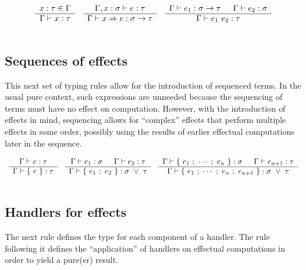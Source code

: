 \documentclass{article}
\begin{document}
\[ \begin{array}{ccc}
  \begin{array}{c}  x:\tau \in \Gamma  \\ \hline  \Gamma \vdash x:\tau  \end{array}

   &

  \begin{array}{c}  \Gamma, x:\sigma \vdash e:\tau  \\ \hline \Gamma \vdash x \Rightarrow e : \sigma \rightarrow \tau  \end{array}

   &

  \begin{array}{c}  \Gamma \vdash e_1 : \sigma \rightarrow \tau \hspace{1.5em}
   \Gamma \vdash e_2 : \sigma  \\ \hline  \Gamma \vdash e_1 ~ e_2 : \tau  \end{array}

  \\\\
 \end{array} \]

\noindent
\subsection{Sequences of effects}
This next set of typing rules allow for the introduction of sequenced terms.
In the usual pure context, such expressions are unneeded because the sequencing of terms
must have no effect on computation.
However, with the introduction of effects in mind, sequencing allows for ``complex'' effects
that perform multiple effects in some order, possibly using the results of earlier
effectual computations later in the sequence.

\[ \begin{array}{ccc}

  \begin{array}{c} 
   \Gamma \vdash e:\tau
   \\ \hline 
   \Gamma \vdash \{ ~ e ~ \} : \tau
   \end{array}

   &

  \begin{array}{c} 
   \Gamma \vdash e_1:\sigma \hspace{1.5em}
   \Gamma \vdash e_2:\tau
   \\ \hline 
   \Gamma \vdash \{ ~ e_1 ~ ; ~ e_2 ~ \} : \sigma ~ \lor ~ \tau
   \end{array}

   &

  \begin{array}{c} 
   \Gamma \vdash \{ ~ e_1 ~ ; ~ \cdots ~ ; ~ e_n ~ \} : \sigma \hspace{1.5em}
   \Gamma \vdash e_{n+1} : \tau
   \\ \hline 
   \Gamma \vdash \{ ~ e_1 ~ ; ~ \cdots ~ ; ~ e_n ~ ; ~ e_{n+1} ~ \}
   : \sigma ~ \lor ~ \tau
   \end{array}

  \\\\
 \end{array} \]

\noindent
\subsection{Handlers for effects}
The next rule defines the type for each component of a handler.
The rule following it defines the ``application'' of handlers on
effectual computations in order to yield a pure(er) result.
\end{document}
